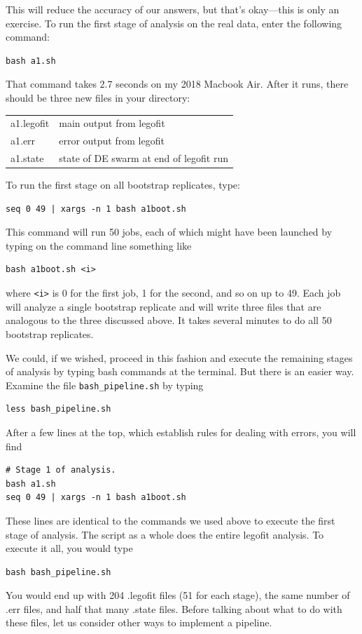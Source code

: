 \documentclass[11pt]{article}
\begin{document}
This will reduce the accuracy of our answers, but that's okay---this
is only an exercise. To run the first stage of analysis on the real
data, enter the following command:
\begin{verbatim}
bash a1.sh
\end{verbatim}
That command takes 2.7 seconds on my 2018 Macbook Air. After it runs,
there should be three new files in your directory:
\begin{center}
  \begin{tabular}{ll}
    a1.legofit & main output from legofit\\
    a1.err     & error output from legofit\\
    a1.state   & state of DE swarm at end of legofit run\\
  \end{tabular}
\end{center}
To run the first stage on all bootstrap replicates, type:
\begin{verbatim}
seq 0 49 | xargs -n 1 bash a1boot.sh
\end{verbatim}
This command will run 50 jobs, each of which might have been launched
by typing on the command line something like
\begin{verbatim}
bash a1boot.sh <i>
\end{verbatim}
where \verb|<i>| is 0 for the first job, 1 for the second, and so on
up to 49. Each job will analyze a single bootstrap replicate and will
write three files that are analogous to the three discussed above. It
takes several minutes to do all 50 bootstrap replicates.

We could, if we wished, proceed in this fashion and execute the
remaining stages of analysis by typing bash commands at the
terminal. But there is an easier way. Examine the file
\verb|bash_pipeline.sh| by typing 
\begin{verbatim}
less bash_pipeline.sh
\end{verbatim}
After a few lines at the top, which establish rules for dealing with
errors, you will find
\begin{verbatim}
# Stage 1 of analysis.
bash a1.sh
seq 0 49 | xargs -n 1 bash a1boot.sh
\end{verbatim}
These lines are identical to the commands we used above to execute the
first stage of analysis. The script as a whole does the entire legofit
analysis. To execute it all, you would type
\begin{verbatim}
bash bash_pipeline.sh
\end{verbatim}
You would end up with 204 .legofit files (51 for each stage), the same
number of .err files, and half that many .state files. Before talking
about what to do with these files, let us consider other ways to
implement a pipeline.
\end{document}
